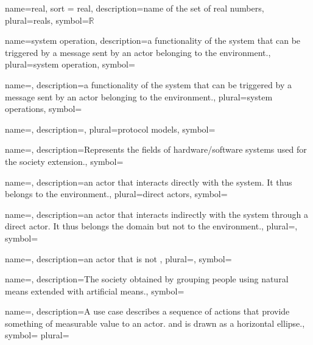 

\newcommand{\glsict}{{information and communication technological}~}

{name={real},
sort = real,
description={name of the set of real numbers},
plural={reals},
symbol={\ensuremath{\mathbb{R}}}
}

{name={system operation},
description={a functionality of the system that can be triggered by a message sent by an actor belonging to the environment.},
plural={system operation},
symbol={}
}

{name={},
description={a functionality of the system that can be triggered by a message sent by an actor belonging to the environment.},
plural={system operations},
symbol={}
}

{name={},
description={},
plural={protocol models},
symbol={}
}

{name={},
description={Represents the fields of hardware/software
systems used for the society extension.},
symbol={}
}

{name={},
description={an actor that interacts directly with the system. It thus belongs to the environment.},
plural={direct actors},
symbol={}
}

{name={},
description={an actor that interacts indirectly with the system through a direct actor. It thus belongs the domain but not to the environment.},
plural={},
symbol={}
}

{name={},
description={an actor that is not },
plural={},
symbol={}
}

{name={},
description={The society obtained by grouping people using natural means
extended with artificial means.},
symbol={} }

{name={},
description={A use case describes a sequence of actions that provide something
of measurable value to an actor. and is drawn as a horizontal ellipse.},
symbol={} 
plural={} }

